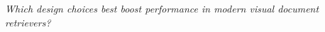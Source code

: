 \begin{center}
\textit{Which design choices best boost performance in modern visual document retrievers?}
\end{center}






